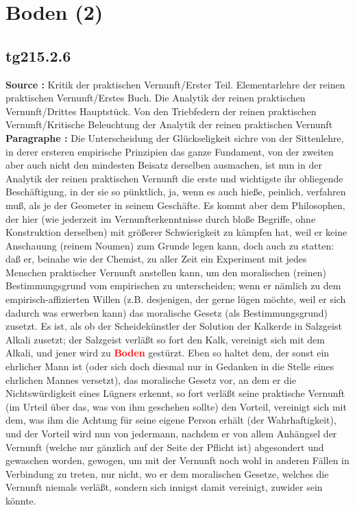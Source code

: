 \documentclass[a4paper,12pt,twoside]{book}
\newcommand{\match}[1]{\textcolor{red}{\textbf{#1}}}
\newcommand{\unnumberedsection}[1]{
	\section*{#1}
	\addcontentsline{toc}{section}{#1}
	\markright{#1}
}
\begin{document}
	\unnumberedsection{Boden (2)} 
	\subsection*{tg215.2.6} 
	\textbf{Source : }Kritik der praktischen Vernunft/Erster Teil. Elementarlehre der reinen praktischen Vernunft/Erstes Buch. Die Analytik der reinen praktischen Vernunft/Drittes Hauptstück. Von den Triebfedern der reinen praktischen Vernunft/Kritische Beleuchtung der Analytik der reinen praktischen Vernunft\\  
	
	\noindent\textbf{Paragraphe : }Die Unterscheidung der Glückseligkeit sichre von der Sittenlehre, in derer ersteren empirische Prinzipien das ganze Fundament, von der zweiten aber auch nicht den mindesten Beisatz derselben ausmachen, ist nun in der Analytik der reinen praktischen Vernunft die erste und wichtigste ihr obliegende Beschäftigung, in der sie so pünktlich, ja, wenn es auch hieße, peinlich, verfahren muß, als je der Geometer in seinem Geschäfte. Es kommt aber dem Philosophen, der hier (wie jederzeit im Vernunfterkenntnisse durch bloße Begriffe, ohne Konstruktion derselben) mit größerer Schwierigkeit zu kämpfen hat, weil er keine Anschauung  (reinem Noumen) zum Grunde legen kann, doch auch zu statten: daß er, beinahe wie der Chemist, zu aller Zeit ein Experiment mit jedes Menschen praktischer Vernunft anstellen kann, um den moralischen (reinen) Bestimmungsgrund vom empirischen zu unterscheiden; wenn er nämlich zu dem empirisch-affizierten Willen (z.B. desjenigen, der gerne lügen möchte, weil er sich dadurch was erwerben kann) das moralische Gesetz (als Bestimmungsgrund) zusetzt. Es ist, als ob der Scheidekünstler der Solution der Kalkerde in Salzgeist Alkali zusetzt; der Salzgeist verläßt so fort den Kalk, vereinigt sich mit dem Alkali, und jener wird zu \match{Boden} gestürzt. Eben so haltet dem, der sonst ein ehrlicher Mann ist (oder sich doch diesmal nur in Gedanken in die Stelle eines ehrlichen Mannes versetzt), das moralische Gesetz vor, an dem er die Nichtswürdigkeit eines Lügners erkennt, so fort verläßt seine praktische Vernunft (im Urteil über das, was von ihm geschehen sollte) den Vorteil, vereinigt sich mit dem, was ihm die Achtung für seine eigene Person erhält (der Wahrhaftigkeit), und der Vorteil wird nun von jedermann, nachdem er von allem Anhängsel der Vernunft (welche nur gänzlich auf der Seite der Pflicht ist) abgesondert und gewaschen worden, gewogen, um mit der Vernunft noch wohl in anderen Fällen in Verbindung zu treten, nur nicht, wo er dem moralischen Gesetze, welches die Vernunft niemals verläßt, sondern sich innigst damit vereinigt, zuwider sein könnte. 
	
\end{document}
